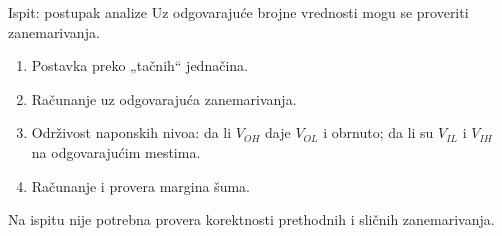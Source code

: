 \begin{frame}[label=09_1-s022]{Ispit: postupak analize}\setlength{\parskip}{2pt}\setlength{\abovedisplayskip}{4pt}\setlength{\belowdisplayskip}{4pt}\setlength{\abovedisplayshortskip}{3pt}\setlength{\belowdisplayshortskip}{3pt}
Uz odgovarajuće brojne vrednosti mogu se proveriti zanemarivanja.
\begin{enumerate}
\item Postavka preko „tačnih“ jednačina.
\item Računanje uz odgovarajuća zanemarivanja.
\item Održivost naponskih nivoa: da li $V_{OH}$ daje $V_{OL}$ i obrnuto; da li su $V_{IL}$ i $V_{IH}$ na odgovarajućim mestima.
\item Računanje i provera margina šuma.
\end{enumerate}
\medskip\alert{Na ispitu nije potrebna provera korektnosti prethodnih i sličnih zanemarivanja.}
\end{frame}
